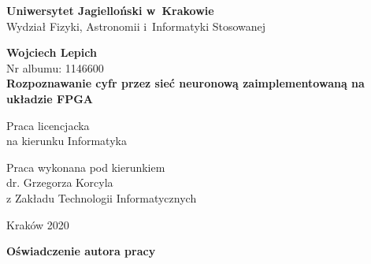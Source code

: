 \documentclass[12pt, oneside, a4paper]{article}
\begin{document}
\thispagestyle{empty}
\begin{titlepage}
    \begin{center}

      \Large
      \textbf{Uniwersytet Jagielloński w~Krakowie}\vspace{0.2cm}\\
        Wydział Fizyki, Astronomii i~Informatyki Stosowanej
      \vspace*{1cm}
               
      \vspace{3cm}
      \Large
      \textbf{Wojciech Lepich}\\\vspace{0.5cm}
      \normalsize Nr albumu: 1146600\\
      \vspace{2cm}
      \Huge
      \textbf{Rozpoznawanie cyfr przez sieć neuronową
      zaimplementowaną na układzie FPGA}
      
      \vspace{1.5cm}
      \normalsize
      Praca licencjacka\\
      na kierunku Informatyka\\ \vspace{0.15cm}
        
      \vfill
      \vspace{2cm}
      \begin{minipage}{1\textwidth}
\begin{flushright}
Praca wykonana pod kierunkiem\\
dr. Grzegorza Korcyla\\
z Zakładu Technologii Informatycznych
\end{flushright}
\end{minipage}
        
        \vspace{2cm}
        \begin{center}
      Kraków 2020
        \end{center}
    \end{center}
\end{titlepage}

\newpage 
\thispagestyle{empty}
\vspace{2.5cm}
\begin{flushleft}
\large \textbf{Oświadczenie autora pracy}\vspace{0.6cm}\\
\end{flushleft}
\end{document}
